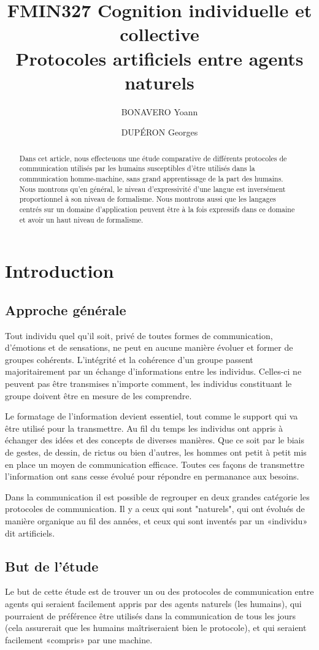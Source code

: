 \documentclass[french,a4paper]{article}
\title{FMIN327 Cognition individuelle et collective\\Protocoles artificiels entre agents naturels}
\author{BONAVERO Yoann \and DUPÉRON Georges}
\begin{document}
\maketitle
\begin{abstract}
  Dans cet article, nous effecteuons une étude comparative de
  différents protocoles de communication utilisés par les humains
  susceptibles d'être utilisés dans la communication homme-machine,
  sans grand apprentissage de la part des humains. Nous montrons qu'en
  général, le niveau d'expressivité d'une langue est inversément
  proportionnel à son niveau de formalisme. Nous montrons aussi que
  les langages centrés sur un domaine d'application peuvent être à la
  fois expressifs dans ce domaine et avoir un haut niveau de
  formalisme.
\end{abstract}
\tableofcontents
\newpage

\section{Introduction}
\subsection{Approche générale}
Tout individu quel qu'il soit, privé de toutes formes de communication, 
d'émotions et de sensations, ne peut en aucune manière évoluer et 
former de groupes cohérents. L'intégrité et la cohérence d'un groupe 
passent majoritairement par un échange d'informations entre les individus.
Celles-ci ne peuvent pas être transmises n'importe comment, les individus 
constituant le groupe doivent être en mesure de les comprendre. 

Le formatage de l'information devient essentiel, tout comme le 
support qui va être utilisé pour la transmettre.
Au fil du temps les individus ont appris à échanger des idées et des 
concepts de diverses manières. Que ce soit par le biais de gestes, de 
dessin, de rictus ou bien d'autres, les hommes ont petit à petit mis en 
place un moyen de communication efficace. Toutes ces façons de 
transmettre l'information ont sans cesse évolué pour répondre en 
permanance aux besoins.

Dans la communication il est possible de regrouper en deux grandes
catégorie les protocoles de communication. Il y a ceux qui sont
"naturels", qui ont évolués de manière organique au fil des années, et
ceux qui sont inventés par un «individu» dit artificiels.

\subsection{But de l'étude}
Le but de cette étude est de trouver un ou des protocoles de
communication entre agents qui seraient facilement appris par des
agents naturels (les humains), qui pourraient de préférence être
utilisés dans la communication de tous les jours (cela assurerait que
les humains maîtriseraient bien le protocole), et qui seraient
facilement «compris» par une machine.
\end{document}
